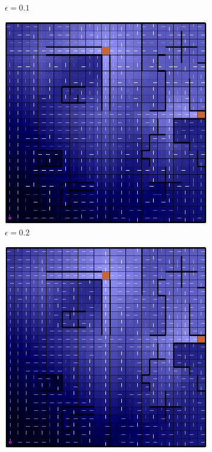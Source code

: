 \documentclass[letterpaper]{article}
\begin{document}
\begin{figure}
\begin{subfigure}{.3\textwidth}
			\caption{$\epsilon = 0.1$}
		\end{subfigure}
		\begin{subfigure}{.3\textwidth}
			\centering
			\includegraphics[width=\linewidth]{images/big_ql_02}
			\caption{$\epsilon = 0.2$}
		\end{subfigure}
		\begin{subfigure}{.3\textwidth}
			\centering
			\includegraphics[width=\linewidth]{images/big_ql_03}

\end{subfigure}
\end{figure}
\end{document}

